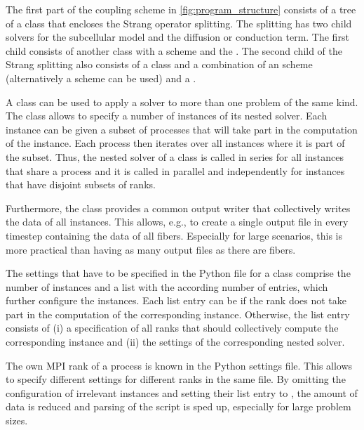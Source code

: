 The first part of the coupling scheme in \cref{fig:program_structure} consists of a tree of a  class that encloses the Strang operator splitting. The splitting has two child solvers for the subcellular model and the diffusion or conduction term. The first child consists of another  class with a  scheme and the \nolinebreak.
The second child of the Strang splitting also consists of a  class and a combination of an  scheme (alternatively a  scheme can be used) and a .

A  class can be used to apply a solver to more than one problem of the same kind. The class allows to specify a number of instances of its nested solver. Each instance can be given a subset of processes that will take part in the computation of the instance. Each process then iterates over all instances where it is part of the subset. Thus, the nested solver of a  class is called in series for all instances that share a process and it is called in parallel and independently for instances that have disjoint subsets of ranks.

Furthermore, the class provides a common output writer that collectively writes the data of all instances. This allows, e.g., to create a single output file in every timestep containing the data of all fibers. Especially for large scenarios, this is more practical than having as many output files as there are fibers.

The settings that have to be specified in the Python file for a  class comprise the number of instances and a list with the according number of entries, which further configure the instances. Each list entry can be  if the rank does not take part in the computation of the corresponding instance. 
Otherwise, the list entry consists of (i) a specification of all ranks that should collectively compute the corresponding instance and (ii) the settings of the corresponding nested solver. 

The own MPI rank of a process is known in the Python settings file. This allows to specify different settings for different ranks in the same file. By omitting the configuration of irrelevant instances and setting their list entry to , the amount of data is reduced and parsing of the script is sped up, especially for large problem sizes.

